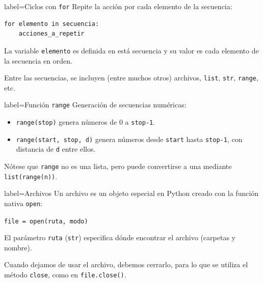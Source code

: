 \documentclass[10pt]{article}
\begin{document}
\begin{multicols*}{3}

\begin{contentbox}{label=Ciclos con \texttt{for}}
    Repite la acción por cada elemento de la secuencia:
\begin{lstlisting}
for elemento in secuencia:
    acciones_a_repetir
\end{lstlisting}
    
    La variable \lstinline!elemento! es definida en está secuencia y su valor es cada elemento de la secuencia en orden.
    
    Entre las secuencias, se incluyen (entre muchos otros) archivos, \lstinline!list!, \lstinline!str!, \lstinline!range!, etc.
\end{contentbox}

\begin{contentbox}{label=Función \lstinline!range!}
    Generación de secuencias numéricas:
    \begin{itemize}
        \item \lstinline!range(stop)! genera números de 0 a \texttt{stop-1}.
        \item \lstinline!range(start, stop, d)! genera números desde \texttt{start} hasta \texttt{stop-1}, con distancia de \texttt{d} entre ellos.
    \end{itemize}
    

    Nótese que \lstinline!range! no es una lista, pero puede convertirse a una mediante \lstinline!list(range(n))!.
\end{contentbox}

\begin{contentbox}{label=Archivos}
    Un archivo es un objeto especial en Python creado con la función nativa \lstinline!open!:
    
    \begin{center}
        \lstinline!file = open(ruta, modo)!
    \end{center}
    
    El parámetro \texttt{ruta} (\lstinline!str!) especifica dónde encontrar el archivo (carpetas y nombre).
    
    Cuando dejamos de usar el archivo, debemos cerrarlo, para lo que se utiliza el método \lstinline!close!, como en \lstinline!file.close()!.
\end{contentbox}
    

\end{multicols*}
\end{document}

